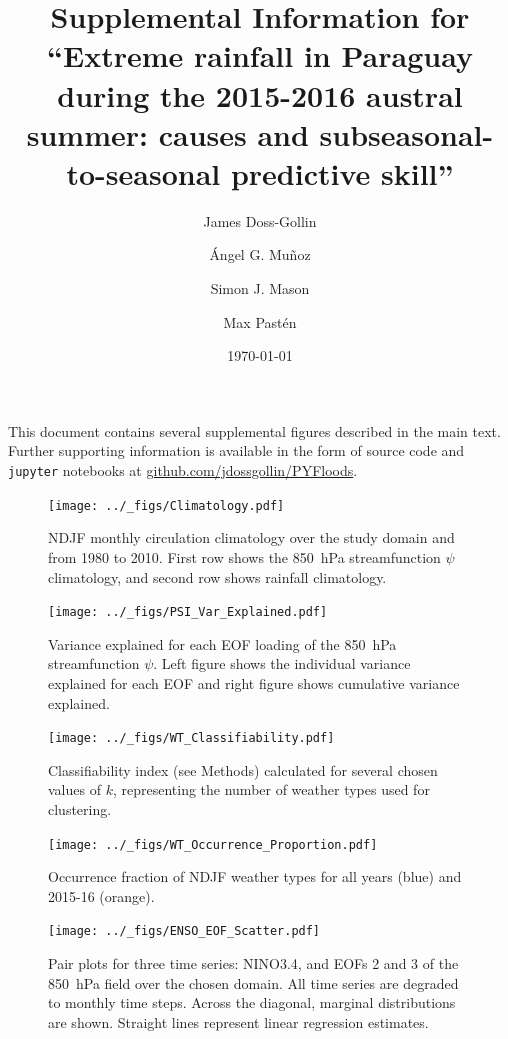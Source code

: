 \documentclass{article}
\title{Supplemental Information for\\``Extreme rainfall in Paraguay during the 2015-2016 austral summer: causes and subseasonal-to-seasonal predictive skill''}
\author{James Doss-Gollin\and \'{A}ngel G. Mu\~{n}oz \and Simon J. Mason \and Max Past\'{e}n}
\date{\today}
\begin{document}
\maketitle

This document contains several supplemental figures described in the main text.
Further supporting information is available in the form of source code and \texttt{jupyter} notebooks at \url{github.com/jdossgollin/PYFloods}.
\listoffigures
\clearpage

\begin{figure}
	\texttt{[image: ../\_figs/Climatology.pdf]}
	\caption{
		NDJF monthly circulation climatology over the study domain and from 1980 to 2010.
    First row shows the \SI{850}{\hecto\pascal} streamfunction $\psi$ climatology, and second row shows rainfall climatology.
	}
\end{figure}

\begin{figure}
  \texttt{[image: ../\_figs/PSI\_Var\_Explained.pdf]}
	\caption{
		Variance explained for each EOF loading of the \SI{850}{\hecto\pascal} streamfunction $\psi$.
    Left figure shows the individual variance explained for each EOF and right figure shows cumulative variance explained.
	}
\end{figure}

\begin{figure}
  \texttt{[image: ../\_figs/WT\_Classifiability.pdf]}
	\caption{
		Classifiability index (see Methods) calculated for several chosen values of $k$, representing the number of weather types used for clustering.
	}
\end{figure}

\begin{figure}
  \texttt{[image: ../\_figs/WT\_Occurrence\_Proportion.pdf]}
	\caption{
		Occurrence fraction of NDJF weather types for all years (blue) and 2015-16 (orange).
	}
\end{figure}

\begin{figure}
  \texttt{[image: ../\_figs/ENSO\_EOF\_Scatter.pdf]}
	\caption{
		Pair plots for three time series: NINO3.4, and EOFs 2 and 3 of the \SI{850}{\hecto\pascal} field over the chosen domain.
    All time series are degraded to monthly time steps.
    Across the diagonal, marginal distributions are shown.
    Straight lines represent linear regression estimates.
	}
\end{figure}
\end{document}
